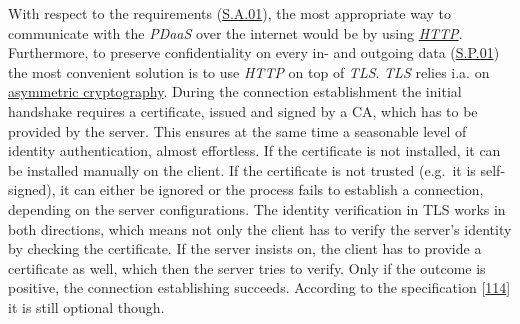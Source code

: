 \documentclass[12pt,english,a4paper,titlepage,cleardoublepage=empty,dottedtoc]{report}
\begin{document}
With respect to the requirements (\protect\hyperlink{sa01}{S.A.01}), the
most appropriate way to communicate with the \emph{PDaaS} over the
internet would be by using \emph{\protect\hyperlink{link_http}{HTTP}}.
Furthermore, to preserve confidentiality on every in- and outgoing data
(\protect\hyperlink{sp01}{S.P.01}) the most convenient solution is to
use \emph{HTTP} on top of \emph{TLS}. \emph{TLS} relies i.a. on
\protect\hyperlink{link_asym-crypto}{asymmetric cryptography}. During
the connection establishment the initial handshake requires a
certificate, issued and signed by a CA, which has to be provided by the
server. This ensures at the same time a seasonable level of identity
authentication, almost effortless. If the certificate is not installed,
it can be installed manually on the client. If the certificate is not
trusted (e.g.~it is self-signed), it can either be ignored or the
process fails to establish a connection, depending on the server
configurations. The identity verification in TLS works in both
directions, which means not only the client has to verify the server's
identity by checking the certificate. If the server insists on, the
client has to provide a certificate as well, which then the server tries
to verify. Only if the outcome is positive, the connection establishing
succeeds. According to the specification
{[}\protect\hyperlink{ref-web_spec_tls-12_client-auth}{114}{]} it is
still optional though.
\end{document}
